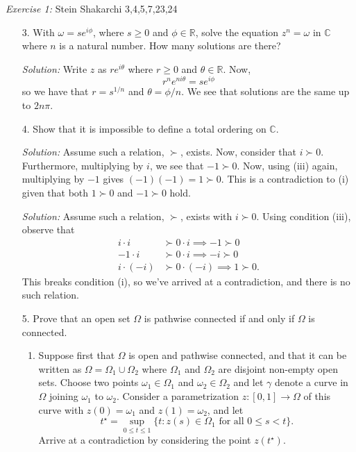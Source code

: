 \documentclass{article}
\newcommand{\exercise}[2]{
\vspace{0.2in}\begin{mdframed}[
  backgroundcolor=problem,
  skipabove=\topsep,
  skipbelow=\topsep
  ]
  \emph{Exercise {#1}:} {#2}
\end{mdframed}}
\newcommand{\R}{\mathbb{R}}
\newcommand{\C}{\mathbb{C}}
\begin{document}
    \exercise{1}{Stein Shakarchi 3,4,5,7,23,24}
    \begin{enumerate}
      \item[3.] With $\omega = se^{i\phi}$, where $s\ge 0$ and $\phi\in \R$, solve the equation $z^n = \omega$ in $\C$ where $n$ is a natural number. How many solutions are there?
      \item[] \textit{Solution:} Write $z$ as $re^{i\theta}$ where $r\ge 0$ and $\theta\in \R$. Now,
      \[ r^n e^{ni\theta} = se^{i\phi}\] 
      so we have that $r = s^{1/n}$ and $\theta = \phi / n$. We see that solutions are the same up to $2n\pi$.
      \item[4.] Show that it is impossible to define a total ordering on $\C$.
      \item[] \textit{Solution:} Assume such a relation, $\succ$, exists. Now, consider that $i \succ 0$. Furthermore, multiplying by $i$, we see that $-1 \succ 0$. Now, using (iii) again, multiplying by $-1$ gives $(-1)(-1) = 1 \succ 0$. This is a contradiction to (i) given that both $1 \succ 0$ and $-1\succ 0$ hold.
      \item[] \textit{Solution:} Assume such a relation, $\succ$, exists with $i\succ 0$. Using condition (iii), observe that 
      \begin{align*}
        i\cdot i &\succ 0\cdot i \implies -1 \succ 0\\
        -1 \cdot i &\succ 0 \cdot i \implies -i\succ 0\\
        i \cdot (-i) &\succ 0\cdot (-i) \implies 1 \succ 0.
      \end{align*}
      This breaks condition (i), so we've arrived at a contradiction, and there is no such relation.
      \item[5.] Prove that an open set $\Omega$ is pathwise connected if and only if $\Omega$ is connected.
      \begin{enumerate}
        \item Suppose first that $\Omega$ is open and pathwise connected, and that it can be written as $\Omega = \Omega_1 \cup \Omega_2$ where $\Omega_1$ and $\Omega_2$ are disjoint non-empty open sets. Choose two points $\omega_1\in\Omega_1$ and $\omega_2\in\Omega_2$ and let $\gamma$ denote a curve in $\Omega$ joining $\omega_1$ to $\omega_2$. Consider a parametrization $z:[0,1]\to\Omega$ of this curve with $z(0)=\omega_1$ and $z(1)=\omega_2$, and let
        \[t^\star = \sup_{0\le t\le 1}\{t:z(s)\in\Omega_1\,\,\text{for all $0\le s < t$}\}.\]
        Arrive at a contradiction by considering the point $z(t^\star)$.

\end{enumerate}
\end{enumerate}
\end{document}
